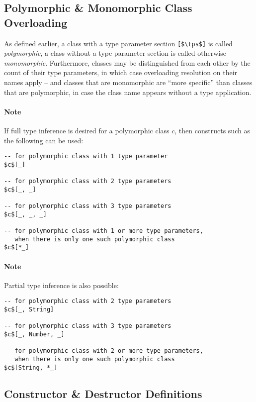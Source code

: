 \subsection{Polymorphic \& Monomorphic Class Overloading}
\label{sec:poly-mono-morphic-classes}

As defined earlier, a class with a type parameter section \lstinline![$\tps$]! is called {\em polymorphic}, a class without a type parameter section is called otherwise {\em monomorphic}. Furthermore, classes may be distinguished from each other by the count of their type parameters, in which case overloading resolution on their names apply -- and classes that are monomorphic are ``more specific'' than classes that are polymorphic, in case the class name appears without a type application.

\paragraph{Note}
If full type inference is desired for a polymorphic class $c$, then constructs such as the following can be used:
\begin{lstlisting}
-- for polymorphic class with 1 type parameter
$c$[_] 

-- for polymorphic class with 2 type parameters
$c$[_, _] 

-- for polymorphic class with 3 type parameters
$c$[_, _, _] 

-- for polymorphic class with 1 or more type parameters,
   when there is only one such polymorphic class
$c$[*_]
\end{lstlisting}

\paragraph{Note}
Partial type inference is also possible: 
\begin{lstlisting}
-- for polymorphic class with 2 type parameters
$c$[_, String] 

-- for polymorphic class with 3 type parameters
$c$[_, Number, _] 

-- for polymorphic class with 2 or more type parameters,
   when there is only one such polymorphic class
$c$[String, *_]
\end{lstlisting}





\subsection{Constructor \& Destructor Definitions}
\label{sec:constructor-destructor-def}

